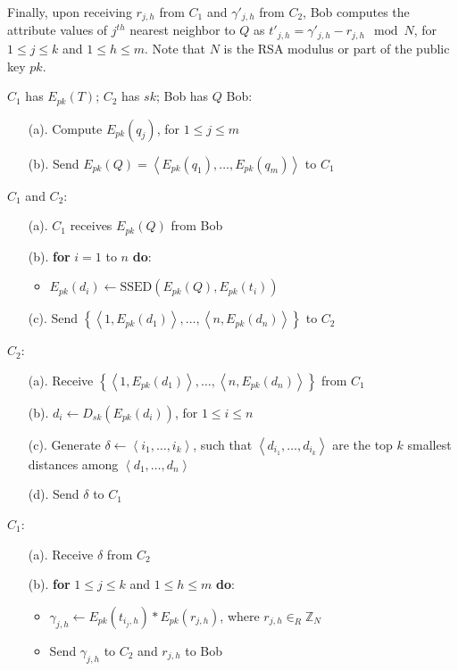 \documentclass{article}
\begin{document}
Finally, upon receiving $r_{j,h}$ from $C_1$ and $\gamma'_{j,h}$ from $C_2$, 
Bob computes the attribute values of $j^{th}$ nearest neighbor to $Q$ as 
$t'_{j,h} = \gamma'_{j,h} - r_{j,h} \mod N$, for $1 \le j \le k$ and $1\le h \le m$. Note that 
$N$ is the RSA modulus or part of the public key $pk$.

\begin{algorithm}[!htbp]
\begin{algorithmic}[1]
\REQUIRE $C_1$ has $E_{pk}(T)$; $C_2$ has $sk$; Bob has $Q$
\STATE  Bob:
\begin{enumerate}\itemsep=0pt
     \item[(a).] Compute $E_{pk}(q_j)$, for $1 \le j \le m$     
     \item[(b).] Send $E_{pk}(Q)=\left\langle E_{pk}(q_1), \ldots, E_{pk}(q_m)\right\rangle$ to $C_1$
\end{enumerate}

\STATE $C_1$ and $C_2$:
\begin{enumerate}\itemsep=0pt
     \item[(a).] $C_1$ receives $E_{pk}(Q)$ from Bob
     \item[(b).] \textbf{for} $i=1$ to $n$ \textbf{do}: 
\begin{itemize}
      \item $E_{pk}(d_i) \gets \textrm{SSED}(E_{pk}(Q), E_{pk}(t_i))$
\end {itemize}     
\item[(c).] Send $\left\{\left\langle 1,E_{pk}(d_1)\right\rangle,\dots,\left\langle n,E_{pk}(d_n)\right\rangle\right\}$ to $C_2$
  \end{enumerate}

\STATE $C_2$:
\begin{enumerate}\itemsep=0pt
     \item[(a).] Receive $\left\{\left\langle 1,E_{pk}(d_1)\right\rangle,\dots,\left\langle n,E_{pk}(d_n)\right\rangle\right\}$ from $C_1$
     \item[(b).] $d_i \gets D_{sk}(E_{pk}(d_i))$, for $1 \le i \le n$
\item[(c).] Generate $\delta \gets \left\langle i_1,\dots,i_k \right\rangle$, such that 
$\left\langle d_{i_1},\ldots, d_{i_k}\right\rangle$ are the top $k$ smallest distances among $\left\langle d_1,\dots,d_n \right\rangle$
     \item[(d).] Send $\delta$ to $C_1$  
 \end{enumerate}

\STATE $C_1$:
\begin{enumerate}\itemsep=0pt
     \item[(a).] Receive $\delta$ from $C_2$
     \item[(b).] \textbf{for} $1 \le j \le k$ and $1 \le h \le m$ \textbf{do}:
       \begin{itemize}
                 \item $\gamma_{j,h} \gets E_{pk}(t_{i_j,h}) \ast E_{pk}(r_{j,h})$, where $r_{j,h} \in_R \mathbb{Z}_N$
                 \item Send $\gamma_{j,h}$ to $C_2$ and $r_{j,h}$ to Bob   
       \end{itemize}            
\end{enumerate}


\end{algorithmic}
\end{algorithm}
\end{document}
